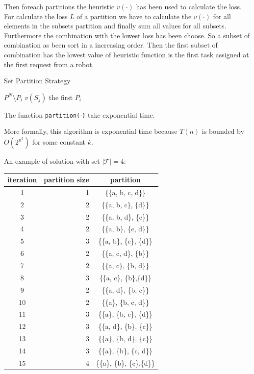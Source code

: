 Then foreach partitions the heuristic $v(\cdot)$ has been used to calculate the loss.
For calculate the loss $L$ of a partition we have to calculate the $v(\cdot)$ for all elements in
the subsets partition and finally sum all values for all subsets. 
Furthermore the combination with the lowest loss has been choose.
So a subset of combination as been sort in a increasing order. 
Then the first subset of combination has the lowest value of heuristic function 
is the first task assigned at the first request from a robot.

\begin{algorithm}
  \caption{Set Partition Strategy} \label{SP}
  \begin{algorithmic}[1]
  \State {}
  $P^N \setminus P_i$
  \EndIf
      $v(S_j)$ 
    \EndFor
  \EndFor
   the first $P_i$
  \EndProcedure
  \end{algorithmic}
\end{algorithm}

The function \texttt{partition($\cdot$)} take exponential time. 

More formally, this algorithm is exponential time because $T(n)$ is bounded by $O(2^{n^{k}})$ 
for some constant $k$.

\newpage

An example of solution with set $|\mathcal{T}| = 4$:
\begin{center}
  \begin{tabular}{|c|r|c|} \hline
  \textbf{iteration} & \textbf{partition size} & \textbf{partition} \\ \hline
  1    & 1    & \{\{a, b, c, d\}\}   \\
  2    & 2    & \{\{a, b, c\}, \{d\}\}   \\
  3    & 2    & \{\{a, b, d\}, \{c\}\}   \\
  4    & 2    & \{\{a, b\}, \{c, d\}\}   \\
  5    & 3    & \{\{a, b\}, \{c\}, \{d\}\}   \\
  6    & 2    & \{\{a, c, d\}, \{b\}\}   \\
  7    & 2    & \{\{a, c\}, \{b, d\}\}   \\
  8    & 3    & \{\{a, c\}, \{b\},\{d\}\}   \\
  9    & 2    & \{\{a, d\}, \{b, c\}\}   \\
  10   & 2    & \{\{a\}, \{b, c, d\}\}   \\
  11   & 3    & \{\{a\}, \{b, c\}, \{d\}\}   \\
  12   & 3    & \{\{a, d\}, \{b\}, \{c\}\}   \\
  13   & 3    & \{\{a\}, \{b, d\}, \{c\}\}   \\
  14   & 3    & \{\{a\}, \{b\}, \{c, d\}\}   \\
  15   & 4    & \{\{a\}, \{b\}, \{c\},\{d\}\}   \\ \hline       
  \end{tabular}
\end{center}



